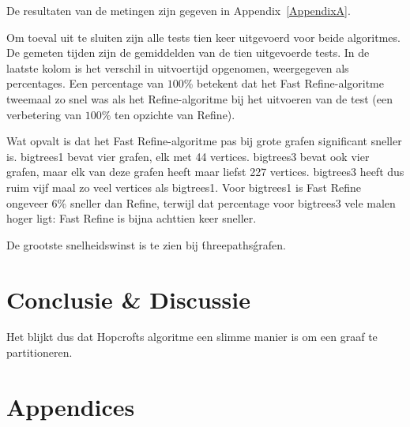 \documentclass[twoside]{article}
\begin{document}
\begin{multicols}{2}
De resultaten van de metingen zijn gegeven in Appendix~\ref{AppendixA}.

Om toeval uit te sluiten zijn alle tests tien keer uitgevoerd voor beide algoritmes. De gemeten tijden zijn de gemiddelden van de tien uitgevoerde tests. In de laatste kolom is het verschil in uitvoertijd opgenomen, weergegeven als percentages. Een percentage van $100$\% betekent dat het Fast Refine-algoritme tweemaal zo snel was als het Refine-algoritme bij het uitvoeren van de test (een verbetering van $100$\% ten opzichte van Refine).

Wat opvalt is dat het Fast Refine-algoritme pas bij grote grafen significant sneller is. bigtrees1 bevat vier grafen, elk met 44 vertices. bigtrees3 bevat ook vier grafen, maar elk van deze grafen heeft maar liefst 227 vertices. bigtrees3 heeft dus ruim vijf maal zo veel vertices als bigtrees1. Voor bigtrees1 is Fast Refine ongeveer 6\% sneller dan Refine, terwijl dat percentage voor bigtrees3 vele malen hoger ligt: Fast Refine is bijna achttien keer sneller.

De grootste snelheidswinst is te zien bij \'threepaths\' grafen. 

\section{Conclusie \& Discussie}
Het blijkt dus dat Hopcrofts algoritme een slimme manier is om een graaf te partitioneren. 

\lipsum[8] %


 


\end{multicols}


\newpage
\section{Appendices}
\end{document}
